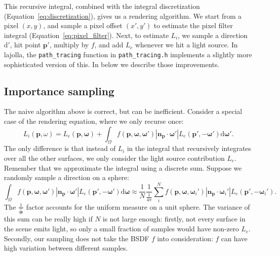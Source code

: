 This recursive integral, combined with the integral discretization (Equation~\ref{eq:discretization}), gives us a rendering algorithm. We start from a pixel $(x, y)$, and sample a pixel offset $(x', y')$ to estimate the pixel filter integral (Equation~\ref{eq:pixel_filter}). Next, to estimate $L_i$, we sample a direction $\mathrm{d}'$, hit point $\mathbf{p}'$, multiply by $f$, and add $L_e$ whenever we hit a light source. In lajolla, the \lstinline{path_tracing} function in \lstinline{path_tracing.h} implements a slightly more sophisticated version of this. In below we describe those improvements.

\subsection{Importance sampling}
The naive algorithm above is correct, but can be inefficient. Consider a special case of the rendering equation, where we only recurse once:
\begin{equation}
    L_i(\mathbf{p}, \omega) = L_e(\mathbf{p}, \mathbf{\omega}) + \int_{\Omega} f(\mathbf{p}, \mathbf{\omega}, \mathbf{\omega}') |\mathbf{n}_{\mathbf{p}} \cdot \mathbf{\omega}'| L_e(\mathbf{p}', -\mathbf{\omega}') \mathrm{d} \mathbf{\omega}'.
\end{equation}
The only difference is that instead of $L_i$ in the integral that recursively integrates over all the other surfaces, we only consider the light source contribution $L_e$. Remember that we approximate the integral using a discrete sum. Suppose we randomly sample a direction on a sphere:
\begin{equation}
  \int_{\Omega} f(\mathbf{p}, \mathbf{\omega}, \mathbf{\omega}') |\mathbf{n}_{\mathbf{p}} \cdot \mathbf{\omega}'| L_e(\mathbf{p}', -\mathbf{\omega}') \mathrm{d} \mathbf{\omega} \approx \frac{1}{N} \frac{1}{\frac{1}{4 \pi}} \sum_{i}^{N} f(\mathbf{p}, \mathbf{\omega}, \mathbf{\omega}_i') |\mathbf{n}_{\mathbf{p}} \cdot \mathbf{\omega}_i'| L_e(\mathbf{p}', -\mathbf{\omega}_i').
\end{equation}
The $\frac{1}{\frac{1}{4\pi}}$ factor accounts for the uniform measure on a unit sphere. The variance of this sum can be really high if $N$ is not large enough: firstly, not every surface in the scene emits light, so only a small fraction of samples would have non-zero $L_e$. Secondly, our sampling does not take the BSDF $f$ into consideration: $f$ can have high variation between different samples.

